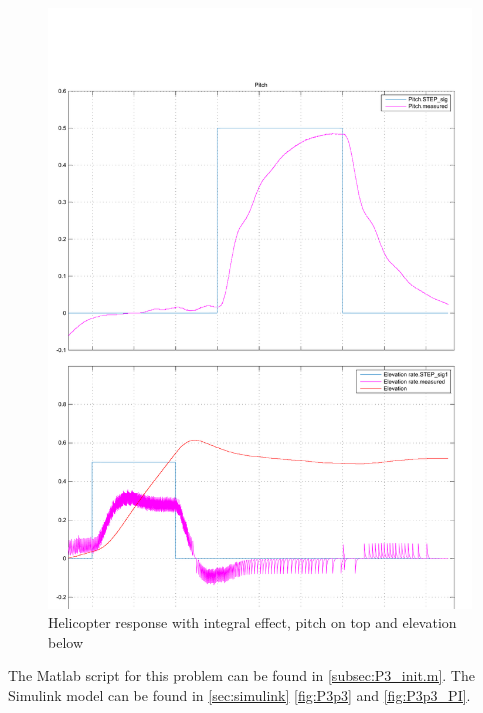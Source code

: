 \begin{figure}[htb]
	\centering
		\includegraphics[width=\textwidth]{figures/P3p3_good.pdf}
	\caption{Helicopter response with integral effect, pitch on top and elevation below}
\label{fig:P3p3_plot}
\end{figure}










The Matlab script for this problem can be found in \cref{subsec:P3_init.m}. The Simulink model can be found in \cref{sec:simulink} \cref{fig:P3p3} and \cref{fig:P3p3_PI}.